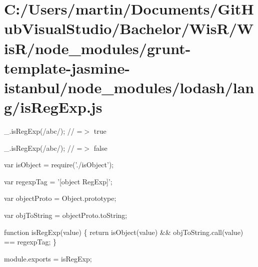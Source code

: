 \hypertarget{_c_1_2_users_2martin_2_documents_2_git_hub_visual_studio_2_bachelor_2_wis_r_2_wis_r_2node_module85a2d408b7c584f794f184114bc9f4e9}{}\section{C\+:/\+Users/martin/\+Documents/\+Git\+Hub\+Visual\+Studio/\+Bachelor/\+Wis\+R/\+Wis\+R/node\+\_\+modules/grunt-\/template-\/jasmine-\/istanbul/node\+\_\+modules/lodash/lang/is\+Reg\+Exp.\+js}
\+\_\+.\+is\+Reg\+Exp(/abc/); // =$>$ true

\+\_\+.\+is\+Reg\+Exp(\textquotesingle{}/abc/\textquotesingle{}); // =$>$ false


\begin{DoxyCodeInclude}
var isObject = require(\textcolor{stringliteral}{'./isObject'});

var regexpTag = \textcolor{stringliteral}{'[object RegExp]'};

var objectProto = Object.prototype;

var objToString = objectProto.toString;

\textcolor{keyword}{function} isRegExp(value) \{
  \textcolor{keywordflow}{return} isObject(value) && objToString.call(value) == regexpTag;
\}

module.exports = isRegExp;
\end{DoxyCodeInclude}
 